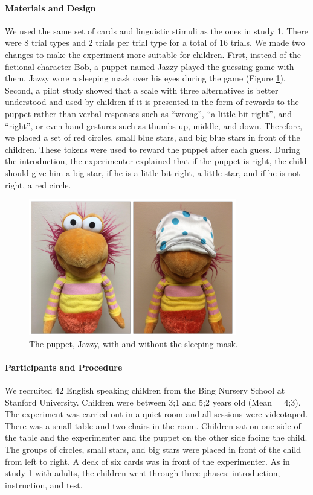 \documentclass[floatsintext,man]{apa6}
\theoremstyle{definition}
\theoremstyle{definition}
\theoremstyle{definition}
\theoremstyle{remark}
\begin{document}
\paragraph{Materials and Design}\label{materials-and-design-1}

We used the same set of cards and linguistic stimuli as the ones in
study 1. There were 8 trial types and 2 trials per trial type for a
total of 16 trials. We made two changes to make the experiment more
suitable for children. First, instead of the fictional character Bob, a
puppet named Jazzy played the guessing game with them. Jazzy wore a
sleeping mask over his eyes during the game (Figure \ref{fig:jazzy}).
Second, a pilot study showed that a scale with three alternatives is
better understood and used by children if it is presented in the form of
rewards to the puppet rather than verbal responses such as
\enquote{wrong}, \enquote{a little bit right}, and \enquote{right}, or
even hand gestures such as thumbs up, middle, and down. Therefore, we
placed a set of red circles, small blue stars, and big blue stars in
front of the children. These tokens were used to reward the puppet after
each guess. During the introduction, the experimenter explained that if
the puppet is right, the child should give him a big star, if he is a
little bit right, a little star, and if he is not right, a red circle.

\begin{figure}
\centering
\includegraphics{figs/jazzy-1.pdf}
\caption{\label{fig:jazzy}The puppet, Jazzy, with and without the sleeping
mask.}
\end{figure}

\paragraph{Participants and
Procedure}\label{participants-and-procedure-1}

We recruited 42 English speaking children from the Bing Nursery School
at Stanford University. Children were between 3;1 and 5;2 years old
(Mean = 4;3). The experiment was carried out in a quiet room and all
sessions were videotaped. There was a small table and two chairs in the
room. Children sat on one side of the table and the experimenter and the
puppet on the other side facing the child. The groups of circles, small
stars, and big stars were placed in front of the child from left to
right. A deck of six cards was in front of the experimenter. As in study
1 with adults, the children went through three phases: introduction,
instruction, and test.
\end{document}
